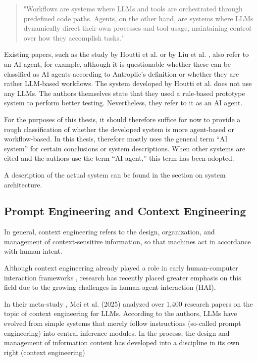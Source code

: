 \begin{quote}
  "Workflows are systems where LLMs and tools are orchestrated through predefined code paths.
  Agents, on the other hand, are systems where LLMs dynamically direct their own processes and tool usage,
  maintaining control over how they accomplish tasks." \cite{anthropicBuildingEffectiveAI}
\end{quote}

Existing papers, such as the study by Houtti et al. or by Liu et al.
\cite{liuProactiveConversationalAgents2025}, also refer to an AI agent, for example, although it is
questionable whether these can be classified as AI agents according to Antroplic’s definition or whether they
are rather LLM-based workflows.
The system developed by Houtti et al. does not use any LLMs. The authors themselves state that they used a
rule-based prototype system to perform better testing. \cite{houttiObserveAskIntervene2025} Nevertheless,
they refer to it as an AI agent.

For the purposes of this thesis, it should therefore suffice for now to provide a rough classification of
whether the developed system is more agent-based or workflow-based. In this thesis, therefore mostly uses the
general term “AI system” for certain conclusions or system descriptions. When other systems are cited and the
authors use the term “AI agent,” this term has been adopted.

A description of the actual system can be found in the section on system architecture.

\subsection{Prompt Engineering and Context Engineering}
\label{sec:context-engineering}

In general, context engineering refers to the design, organization, and management of context-sensitive information,
so that machines act in accordance with human intent. \cite[p. 3]{huaContextEngineering202025}

Although context engineering already played a role in early human-computer interaction frameworks
\cite[p. 1]{huaContextEngineering202025}, research has recently placed greater emphasis on this field due to
the growing challenges in
human-agent interaction (HAI).

In their meta-study \cite{meiSurveyContextEngineering2025}, Mei et al. (2025) analyzed over 1,400 research
papers on the topic of context engineering for LLMs. According to the authors, LLMs have evolved from simple
systems that merely follow instructions (so-called prompt engineering) into central inference modules. In the
process, the design and management of information content has developed into a discipline in its own right
(context engineering) \cite{meiSurveyContextEngineering2025}

